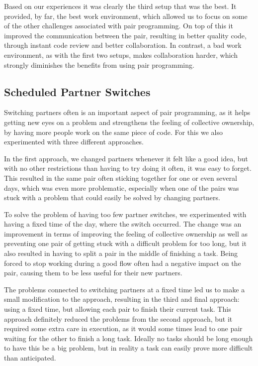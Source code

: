 Based on our experiences it was clearly the third setup that was the best.
It provided, by far, the best work environment, which allowed us to focus on some of the other challenges associated with pair programming.
On top of this it improved the communication between the pair, resulting in better quality code, through instant code review and better collaboration.
In contrast, a bad work environment, as with the first two setups, makes collaboration harder, which strongly diminishes the benefits from using pair programming.


\subsection{Scheduled Partner Switches}
Switching partners often is an important aspect of pair programming, as it helps getting new eyes on a problem and strengthens the feeling of collective ownership, by having more people work on the same piece of code.
For this we also experimented with three different approaches.

In the first approach, we changed partners whenever it felt like a good idea, but with no other restrictions than having to try doing it often, it was easy to forget.
This resulted in the same pair often sticking together for one or even several days, which was even more problematic, especially when one of the pairs was stuck with a problem that could easily be solved by changing partners.

To solve the problem of having too few partner switches, we experimented with having a fixed time of the day, where the switch occurred.
The change was an improvement in terms of improving the feeling of collective ownership as well as preventing one pair of getting stuck with a difficult problem for too long, but it also resulted in having to split a pair in the middle of finishing a task.
Being forced to stop working during a good flow often had a negative impact on the pair, causing them to be less useful for their new partners.

The problems connected to switching partners at a fixed time led us to make a small modification to the approach, resulting in the third and final approach: using a fixed time, but allowing each pair to finish their current task.
This approach definitely reduced the problems from the second approach, but it required some extra care in execution, as it would some times lead to one pair waiting for the other to finish a long task. Ideally no tasks should be long enough to have this be a big problem, but in reality a task can easily prove more difficult than anticipated.

